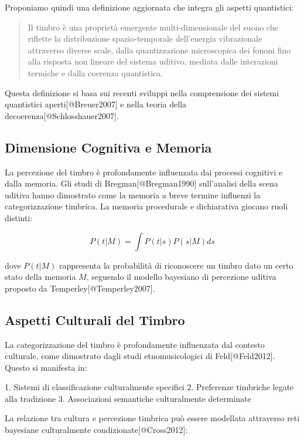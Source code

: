 \documentclass[a4paper,11pt]{article}
\begin{document}
Proponiamo quindi una definizione aggiornata che integra gli aspetti
quantistici:

\begin{quote}
Il timbro è una proprietà emergente multi-dimensionale del suono che
riflette la distribuzione spazio-temporale dell'energia vibrazionale
attraverso diverse scale, dalla quantizzazione microscopica dei fononi
fino alla risposta non lineare del sistema uditivo, mediata dalle
interazioni termiche e dalla coerenza quantistica.
\end{quote}

Questa definizione si basa sui recenti sviluppi nella comprensione dei
sistemi quantistici aperti{[}@Breuer2007{]} e nella teoria della
decoerenza{[}@Schlosshauer2007{]}.

\subsection{Dimensione Cognitiva e
Memoria}\label{dimensione-cognitiva-e-memoria}

La percezione del timbro è profondamente influenzata dai processi
cognitivi e dalla memoria. Gli studi di Bregman{[}@Bregman1990{]}
sull'analisi della scena uditiva hanno dimostrato come la memoria a
breve termine influenzi la categorizzazione timbrica. La memoria
procedurale e dichiarativa giocano ruoli distinti:

\[P(t|M) = \int P(t|s)P(s|M)ds\]

dove \(P(t|M)\) rappresenta la probabilità di riconoscere un timbro dato
un certo stato della memoria \(M\), seguendo il modello bayesiano di
percezione uditiva proposto da Temperley{[}@Temperley2007{]}.

\subsection{Aspetti Culturali del
Timbro}\label{aspetti-culturali-del-timbro}

La categorizzazione del timbro è profondamente influenzata dal contesto
culturale, come dimostrato dagli studi etnomusicologici di
Feld{[}@Feld2012{]}. Questo si manifesta in:

1. Sistemi di classificazione culturalmente specifici 2. Preferenze
timbriche legate alla tradizione 3. Associazioni semantiche
culturalmente determinate

La relazione tra cultura e percezione timbrica può essere modellata
attraverso reti bayesiane culturalmente condizionate{[}@Cross2012{]}:
\end{document}
